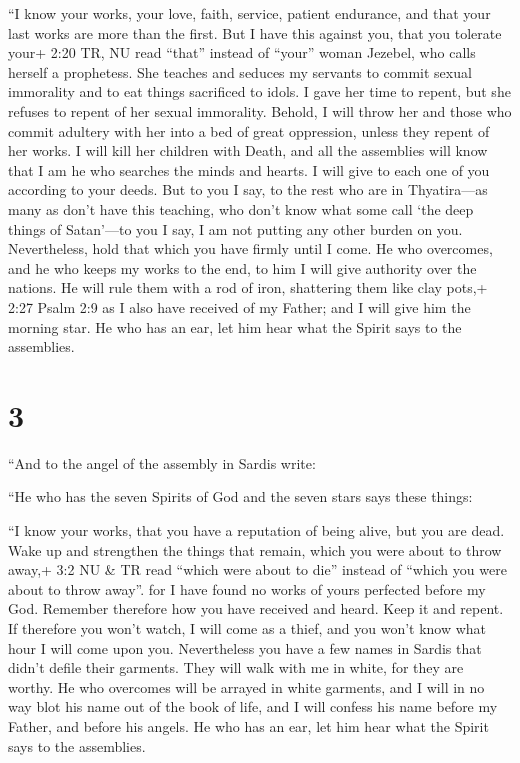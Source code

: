  ``I know your works, your love, faith, service, patient
endurance, and that your last works are more than the first.
 But I have this against you, that you tolerate your+ 2:20
TR, NU read ``that'' instead of ``your'' woman Jezebel, who calls
herself a prophetess. She teaches and seduces my servants to commit
sexual immorality and to eat things sacrificed to idols.  I
gave her time to repent, but she refuses to repent of her sexual
immorality.  Behold, I will throw her and those who commit
adultery with her into a bed of great oppression, unless they repent of
her works.  I will kill her children with Death, and all
the assemblies will know that I am he who searches the minds and hearts.
I will give to each one of you according to your deeds. 
But to you I say, to the rest who are in Thyatira---as many as don't
have this teaching, who don't know what some call `the deep things of
Satan'---to you I say, I am not putting any other burden on you.
 Nevertheless, hold that which you have firmly until I
come.  He who overcomes, and he who keeps my works to the
end, to him I will give authority over the nations.  He
will rule them with a rod of iron, shattering them like clay pots,+ 2:27
Psalm 2:9 as I also have received of my Father;  and I will
give him the morning star.  He who has an ear, let him hear
what the Spirit says to the assemblies.

\hypertarget{section-2}{%
\section{3}\label{section-2}}

 ``And to the angel of the assembly in Sardis write:

``He who has the seven Spirits of God and the seven stars says these
things:

``I know your works, that you have a reputation of being alive, but you
are dead.  Wake up and strengthen the things that remain,
which you were about to throw away,+ 3:2 NU \& TR read ``which were
about to die'' instead of ``which you were about to throw away''. for I
have found no works of yours perfected before my God. 
Remember therefore how you have received and heard. Keep it and repent.
If therefore you won't watch, I will come as a thief, and you won't know
what hour I will come upon you.  Nevertheless you have a few
names in Sardis that didn't defile their garments. They will walk with
me in white, for they are worthy.  He who overcomes will be
arrayed in white garments, and I will in no way blot his name out of the
book of life, and I will confess his name before my Father, and before
his angels.  He who has an ear, let him hear what the Spirit
says to the assemblies.

